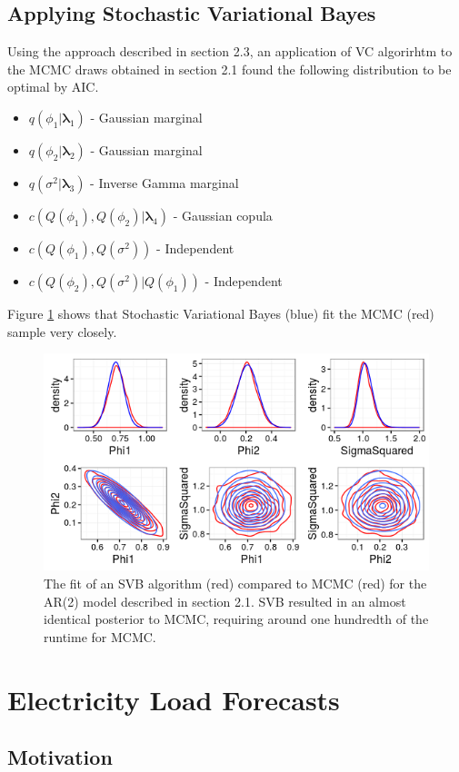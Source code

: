 \documentclass[12pt,a4paper]{article}%
\numberwithin{equation}{section}
\begin{document}
\subsection{Applying Stochastic Variational Bayes}

Using the approach described in section 2.3, an application of VC algorirhtm to the MCMC draws obtained in section 2.1 found the following distribution to be optimal by AIC.

\begin{itemize}
\item $q(\phi_1 | \boldsymbol{\lambda}_1)$ - Gaussian marginal
\item $q(\phi_2| \boldsymbol{\lambda}_2)$ - Gaussian marginal
\item $q(\sigma^2| \boldsymbol{\lambda}_3)$ - Inverse Gamma marginal
\item $c(Q(\phi_1), Q(\phi_2) | \boldsymbol{\lambda}_4)$ - Gaussian copula
\item $c(Q(\phi_1), Q(\sigma^2))$ - Independent
\item $c(Q(\phi_2), Q(\sigma^2) | Q(\phi_1))$ - Independent
\end{itemize}

Figure \ref{VBfit} shows that Stochastic Variational Bayes (blue) fit the MCMC (red) sample very closely.

\begin{figure}[h]
\centering
\includegraphics[width=0.7\linewidth,height=\textheight,keepaspectratio]{VBfit.png}
\caption{The fit of an SVB algorithm (red) compared to MCMC (red) for the AR(2) model described in section 2.1. SVB resulted in an almost identical posterior to MCMC, requiring around one hundredth of the runtime for MCMC.}
\label{VBfit}
\end{figure}

\section{Electricity Load Forecasts}
\subsection{Motivation}
\end{document}

